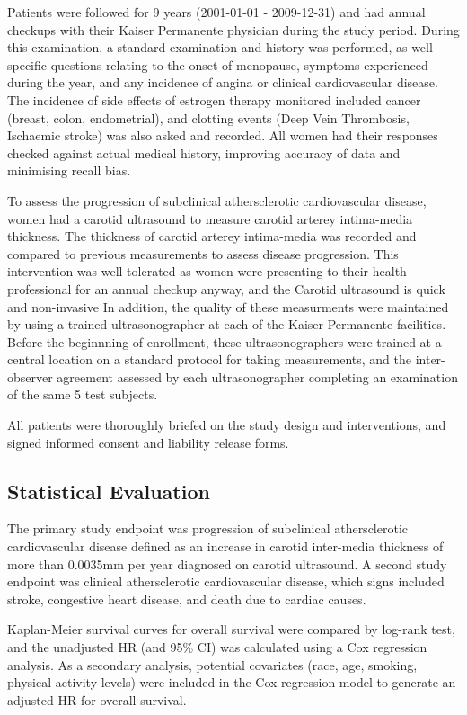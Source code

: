 \documentclass[11pt]{article}
\begin{document}
		
		Patients were followed for 9 years (2001-01-01 - 2009-12-31) and had annual checkups with their Kaiser Permanente physician during the study period.
		During this examination, a standard examination and history was performed, as well specific questions relating to the onset of menopause, symptoms experienced during the year, and any incidence of angina or clinical cardiovascular disease.
		The incidence of side effects of estrogen therapy monitored included cancer (breast, colon, endometrial), and clotting events (Deep Vein Thrombosis, Ischaemic stroke) was also asked and recorded.
		All women had their responses checked against actual medical history, improving accuracy of data and minimising recall bias.


		To assess the progression of subclinical athersclerotic cardiovascular disease, women had a carotid ultrasound to measure carotid arterey intima-media thickness.
		The thickness of carotid arterey intima-media was recorded and compared to previous measurements to assess disease progression.
		This intervention was well tolerated as women were presenting to their health professional for an annual checkup anyway, and the Carotid ultrasound is quick and non-invasive
		In addition, the quality of these measurments were maintained by using a trained ultrasonographer at each of the Kaiser Permanente facilities.
		Before the beginnning of enrollment, these ultrasonographers were trained at a central location on a standard protocol for taking measurements, and the inter-observer agreement assessed by each ultrasonographer completing an examination of the same 5 test subjects.


		All patients were thoroughly briefed on the study design and interventions, and signed informed consent and liability release forms.


		\newpage
	\subsection{Statistical Evaluation}
		The primary study endpoint was progression of subclinical athersclerotic cardiovascular disease defined as an increase in carotid inter-media thickness of more than 0.0035mm per year diagnosed on carotid ultrasound.
		A second study endpoint was clinical athersclerotic cardiovascular disease, which signs included stroke, congestive heart disease, and death due to cardiac causes.


		Kaplan-Meier survival curves for overall survival were compared by log-rank test, and the unadjusted HR (and 95\% CI) was calculated using a Cox regression analysis.
		As a secondary analysis, potential covariates (race, age, smoking, physical activity levels) were included in the Cox regression model to generate an adjusted HR for overall survival.
\end{document}
